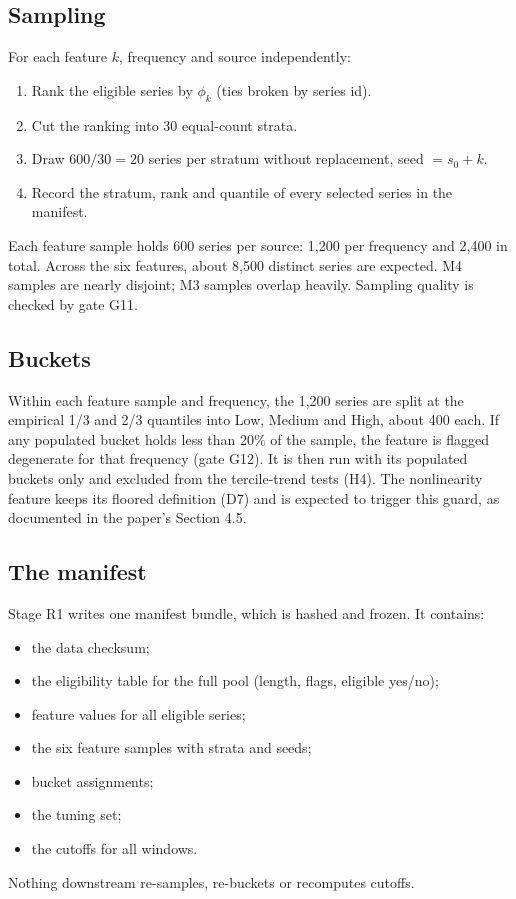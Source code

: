 \documentclass[11pt,a4paper]{article}
\begin{document}
\subsection{Sampling}\label{sec:sampling}

For each feature $k$, frequency and source independently:
\begin{enumerate}
  \item Rank the eligible series by $\phi_k$ (ties broken by series id).
  \item Cut the ranking into 30 equal-count strata.
  \item Draw $600/30 = 20$ series per stratum without replacement, seed $= s_0 + k$.
  \item Record the stratum, rank and quantile of every selected series in the manifest.
\end{enumerate}
Each feature sample holds 600 series per source: 1,200 per frequency and 2,400 in total. Across
the six features, about 8,500 distinct series are expected. M4 samples are nearly disjoint; M3
samples overlap heavily. Sampling quality is checked by gate G11.

\subsection{Buckets}

Within each feature sample and frequency, the 1,200 series are split at the empirical 1/3 and 2/3
quantiles into Low, Medium and High, about 400 each. If any populated bucket holds less than 20\%
of the sample, the feature is flagged degenerate for that frequency (gate G12). It is then run with
its populated buckets only and excluded from the tercile-trend tests (H4). The nonlinearity
feature keeps its floored definition (D7) and is expected to trigger this guard, as documented in
the paper's Section 4.5.

\subsection{The manifest}

Stage R1 writes one manifest bundle, which is hashed and frozen. It contains:
\begin{itemize}
  \item the data checksum;
  \item the eligibility table for the full pool (length, flags, eligible yes/no);
  \item feature values for all eligible series;
  \item the six feature samples with strata and seeds;
  \item bucket assignments;
  \item the tuning set;
  \item the cutoffs for all windows.
\end{itemize}
Nothing downstream re-samples, re-buckets or recomputes cutoffs.
\end{document}
